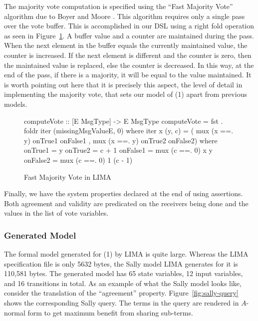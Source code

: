 The majority vote computation is specified using the ``Fast Majority Vote''
algorithm due to Boyer and Moore \cite{mjrty}. This algorithm requires only a
single pass over the vote buffer. This is accomplished in our DSL using a
right fold operation as seen in Figure~\ref{fig:majority-vote}. A buffer value
and a counter are maintained during the pass. When the next element in the
buffer equals the currently maintained value, the counter is increased. If the
next element is different and the counter is zero, then the maintained value
is replaced, else the counter is decreased. In this way, at the end of the
pass, if there is a majority, it will be equal to the value maintained. It is worth
pointing out here that it is precisely this aspect, the level of detail in
implementing the majority vote, that sets our model of \OM(1) apart from
previous models.

\begin{figure}
\begin{lima}
computeVote :: [E MsgType] -> E MsgType
computeVote = fst . foldr iter (missingMsgValueE, 0)
  where
    iter x (y, c) = ( mux (x ==. y) onTrue1 onFalse1
                    , mux (x ==. y) onTrue2 onFalse2)
      where
        onTrue1       = y
        onTrue2       = c + 1
        onFalse1      = mux (c ==. 0) x y
        onFalse2      = mux (c ==. 0) 1 (c - 1)
\end{lima}
\caption{Fast Majority Vote in LIMA}
\label{fig:majority-vote}
\end{figure}

Finally, we have the system properties declared at the end of  using
assertions. Both agreement and validity are predicated on the receivers being
done and the values in the list of vote variables.

\subsubsection{Generated Model}\label{sssec:om1-sally-model}

The formal model generated for \OM(1) by LIMA is quite large. Whereas the LIMA
specification file is only 5632 bytes, the Sally model LIMA generates for it
is 110,581 bytes. The generated model has 65 state variables, 12 input
variables, and 16 transitions in total. As an example of what the Sally model
looks like, consider the translation of the ``agreement'' property. Figure~\ref{fig:sally-query} shows the corresponding Sally query. The terms in the
query are rendered in $A$-normal form \cite{Sabry-Felleisen} to get maximum
benefit from sharing sub-terms.

